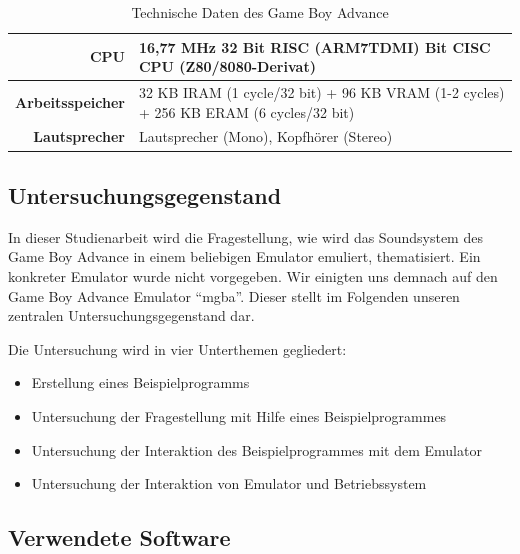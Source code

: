 \documentclass[11pt,a4paper]{scrartcl}
\begin{document}
\begin{table}[h]
    \centering
    \begin{tabular}{ r | p{10cm} }
        \textbf{CPU} & 16,77 MHz 32 Bit RISC (ARM7TDMI)\newline
              8 Bit CISC CPU (Z80/8080-Derivat) \\
        \hline
        \textbf{Arbeitsspeicher} & 32 KB IRAM (1 cycle/32 bit)\newline
                          + 96 KB VRAM (1-2 cycles)\newline
                          + 256 KB ERAM (6 cycles/32 bit) \\
        \hline
        \textbf{Lautsprecher} & Lautsprecher (Mono), Kopfh\"orer (Stereo) \\
    \end{tabular}
    \caption{Technische Daten des Game Boy Advance\cite{GameBoyTechnischeDaten}}
    \label{table:TechnischeDaten}
\end{table}

\newpage

\subsection{Untersuchungsgegenstand}

In dieser Studienarbeit wird die Fragestellung, wie wird das Soundsystem des Game Boy Advance in einem beliebigen Emulator emuliert, thematisiert. Ein konkreter Emulator wurde nicht vorgegeben. Wir einigten uns demnach auf den Game Boy Advance Emulator \enquote{mgba}. Dieser stellt im Folgenden unseren zentralen Untersuchungsgegenstand dar.

Die Untersuchung wird in vier Unterthemen gegliedert:

\begin{itemize}
    \item Erstellung eines Beispielprogramms
    \item Untersuchung der Fragestellung mit Hilfe eines Beispielprogrammes
    \item Untersuchung der Interaktion des Beispielprogrammes mit dem Emulator
    \item Untersuchung der Interaktion von Emulator und Betriebssystem
\end{itemize}

\subsection{Verwendete Software}
\end{document}
